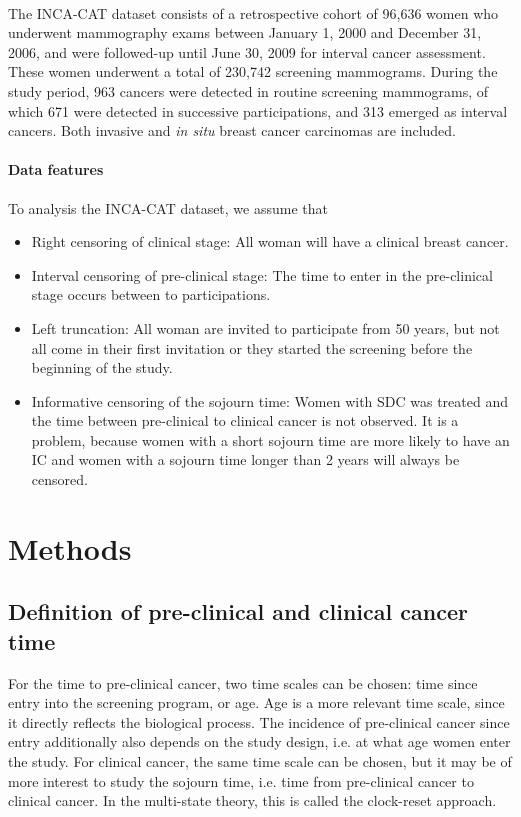 \documentclass[10pt,a4paper]{article}
\begin{document}
\paragraph{}The INCA-CAT dataset consists of a retrospective cohort of 96,636 women who underwent mammography exams between January 1, 2000 and December 31, 2006, and were followed-up until June 30, 2009 for interval cancer assessment. These women underwent a total of 230,742 screening mammograms. During the study period, 963 cancers were detected in routine screening mammograms, of which 671 were detected in successive participations, and 313 emerged as interval cancers. Both invasive and \textit{in situ} breast cancer carcinomas are included. 

\paragraph{Data features}To analysis the INCA-CAT dataset, we assume that
\begin{itemize}
\item Right censoring of clinical stage: All woman will have a clinical breast cancer.
\item Interval censoring of pre-clinical stage: The time to enter in the pre-clinical stage occurs between to participations.
\item Left truncation: All woman are invited to participate from 50 years, but not all come in their first invitation or they started the screening before the beginning of the study.
\item Informative censoring of the sojourn time: Women with SDC was treated and the time between pre-clinical to clinical cancer is not observed. It is a problem, because women with a short sojourn time are more likely to have an IC and women with a sojourn time longer than 2 years will always be censored.
\end{itemize}

\section{Methods}
\subsection{Definition of pre-clinical and clinical cancer time}
For the time to pre-clinical cancer, two time scales can be chosen: time since entry into the screening program, or age. Age is a more relevant time scale, since it directly reflects the biological process. The incidence of pre-clinical cancer since entry additionally also depends on the study design, i.e. at what age women enter the study. For clinical cancer, the same time scale can be chosen, but it may be of more interest to study the sojourn time, i.e. time from pre-clinical cancer to clinical cancer. In the multi-state theory, this is called the clock-reset approach.
\end{document}
